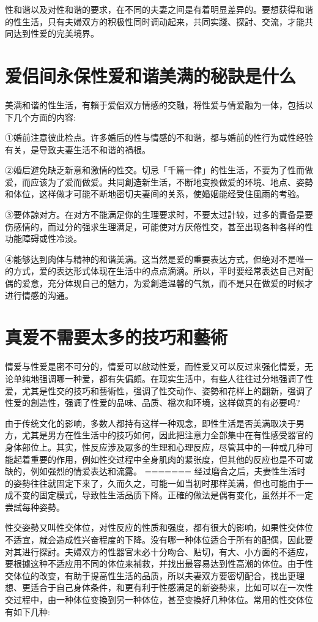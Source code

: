 \documentclass[12pt,UTF8]{ctexbook}
\begin{document}
性和谐以及对性和谐的要求，在不同的夫妻之间是有着明显差异的。要想获得和谐的性生活，只有夫婦双方的积极性同时调动起来，共同实踐、探討、交流，才能共同达到性爱的完美境界。

\section{爱侣间永保性爱和谐美满的秘訣是什么}

美满和谐的性生活，有賴于爱侣双方情感的交融，将性爱与情爱融为一体，包括以下几个方面的内容:

①婚前注意彼此检点。许多婚后的性与情感的不和谐，都与婚前的性行为或性经验有关，是导致夫妻生活不和谐的禍根。

②婚后避免缺乏新意和激情的性交。切忌「千篇一律」的性生活，不要为了性而做爱，而应该为了爱而做爱。共同創造新生活，不断地变換做爱的环境、地点、姿勢和体位，这样做才可能不断地密切夫妻间的关系，使婚姻能经受住風雨的考验。

③要体諒对方。在对方不能满足你的生理要求时，不要太过計较，过多的責备是要伤感情的，而过分的强求生理满足，可能使对方厌倦性交，甚至出现各种各样的性功能障碍或性冷淡。

④能够达到肉体与精神的和谐美满。这当然是爱的重要表达方式，但绝对不是唯一的方式，爱的表达形式体现在生活中的点点滴滴。所以，平时要经常表达自己对配偶的爱意，充分体现自己的魅力，为爱創造温馨的气氛，而不是只在做爱的时候才进行情感的沟通。

\section{真爱不需要太多的技巧和藝術}

情爱与性爱是密不可分的，情爱可以啟动性爱，而性爱又可以反过来强化情爱，无论单纯地强调哪一种爱，都有失偏頗。在现实生活中，有些人往往过分地强调了性爱，尤其是性交的技巧和藝術性，强调了性交动作、姿勢和花样上的翻新，强调了性爱的創造性，强调了性爱的品味、品质、檔次和环境，这样做真的有必要吗?

由于传统文化的影响，多数人都持有这样一种观念，即性生活是否美满取决于男方，尤其是男方在性生活中的技巧如何，因此把注意力全部集中在有性感受器官的身体部位上。其实，性反应涉及眾多的生理和心理反应，尽管其中的一种或几种可能起着重要的作用，例如性交过程中全身肌肉的紧张度，但其他的反应也是不可或缺的，例如强烈的情爱表达和流露。
=======
经过磨合之后，夫妻性生活时的姿勢往往就固定下来了，久而久之，可能一如当初时那样美满，但也可能由于一成不变的固定模式，导致性生活品质下降。正確的做法是偶有变化，虽然并不一定尝試每种姿勢。

性交姿勢又叫性交体位，对性反应的性质和强度，都有很大的影响，如果性交体位不适宜，就会造成性兴奋程度的下降。没有哪一种体位适合于所有的配偶，因此要对其进行探討。夫婦双方的性器官未必十分吻合、贴切，有大、小方面的不适应，要根據这种不适应用不同的体位来補救，并找出最容易达到性高潮的体位。由于性交体位的改变，有助于提高性生活的品质，所以夫妻双方要密切配合，找出更理想、更适合于自己身体条件，和更有利于性感满足的新姿勢来，比如可以在一次性交过程中，由一种体位变換到另一种体位，甚至变換好几种体位。常用的性交体位有如下几种:
\end{document}
